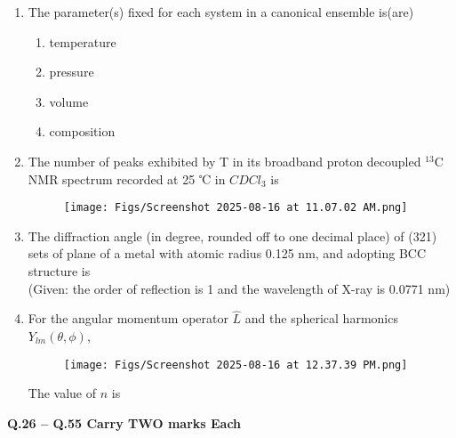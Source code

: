 \documentclass[12pt]{article}
\begin{document}
\begin{enumerate}
\item The parameter(s) fixed for each system in a canonical ensemble is(are)

\begin{enumerate}
    \item temperature
    \item pressure
    \item volume
    \item composition
\end{enumerate}

\item The number of peaks exhibited by T in its broadband proton decoupled $^{13}$C NMR
spectrum recorded at 25 ℃ in $CDCl_3$ is

\begin{figure}[H]
            \centering
            \texttt{[image: Figs/Screenshot 2025-08-16 at 11.07.02 AM.png]}
            \caption{}
            \end{figure}


\item The diffraction angle (in degree, rounded off to one decimal place) of (321) sets of
plane of a metal with atomic radius 0.125 nm, and adopting BCC structure is \\ 

(Given: the order of reflection is 1 and the wavelength of X-ray is 0.0771 nm)

\item For the angular momentum operator $\hat{L}$ and the spherical harmonics $Y_{lm}(\theta,\phi)$,
\begin{figure}[H]
\centering
\texttt{[image: Figs/Screenshot 2025-08-16 at 12.37.39 PM.png]}
\end{figure}
The value of $n$ is

\end{enumerate}

\textbf{Q.26 – Q.55 Carry TWO marks Each}
\end{document}
